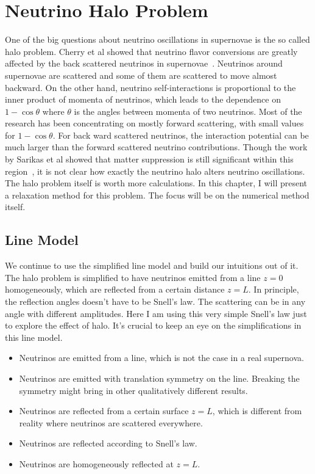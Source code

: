 

\chapter{\label{chap:halo}Neutrino Halo Problem}


One of the big questions about neutrino oscillations in supernovae is the so called halo problem. Cherry et al showed that neutrino flavor conversions are greatly affected by the back scattered neutrinos in supernovae~\cite{Cherry2012}. Neutrinos around supernovae are scattered and some of them are scattered to move almost backward. On the other hand, neutrino self-interactions is proportional to the inner product of momenta of neutrinos, which leads to the dependence on $1-\cos\theta$ where $\theta$ is the angles between momenta of two neutrinos. Most of the research has been concentrating on mostly forward scattering, with small values for $1-\cos\theta$. For back ward scattered neutrinos, the interaction potential can be much larger than the forward scattered neutrino contributions. Though the work by Sarikas et al showed that matter suppression is still significant within this region~\cite{Sarikas2012a}, it is not clear how exactly the neutrino halo alters neutrino oscillations. The halo problem itself is worth more calculations. In this chapter, I will present a relaxation method for this problem. The focus will be on the numerical method itself.


\section{\label{chap:halo-sec:line}Line Model}

We continue to use the simplified line model and build our intuitions out of it. The halo problem is simplified to have neutrinos emitted from a line $z=0$ homogeneously, which are reflected from a certain distance $z=L$. In principle, the reflection angles doesn’t have to be Snell’s law. The scattering can be in any angle with different amplitudes. Here I am using this very simple Snell’s law just to explore the effect of halo. It's crucial to keep an eye on the simplifications in this line model.
\begin{itemize}
    \item Neutrinos are emitted from a line, which is not the case in a real supernova.
    \item Neutrinos are emitted with translation symmetry on the line. Breaking the symmetry might bring in other qualitatively different results.
    \item Neutrinos are reflected from a certain surface $z=L$, which is different from reality where neutrinos are scattered everywhere.
    \item Neutrinos are reflected according to Snell's law.
    \item Neutrinos are homogeneously reflected at $z=L$.
\end{itemize}



